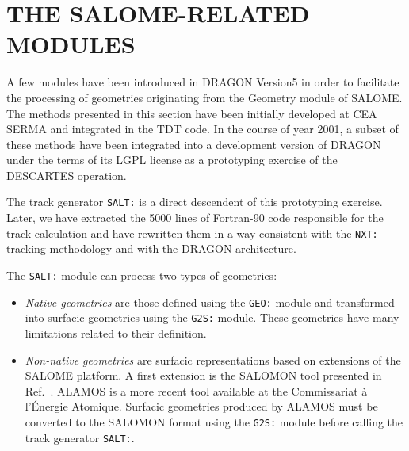 
\section{THE SALOME-RELATED MODULES}\label{sect:SalomeModuleInput}

A few modules have been introduced in DRAGON Version5 in order to facilitate the
processing of geometries originating from the Geometry module of SALOME.\cite{salome}
The methods presented in this section have been initially developed at CEA SERMA and
integrated in the TDT code.\cite{tdt,lyioussi} In the course of year 2001, a subset of
these methods have been integrated into a development version of DRAGON under the terms
of its LGPL license as a prototyping exercise of the DESCARTES operation.\cite{salt}

\vskip 0.08cm

The track generator {\tt SALT:} is a direct descendent of this prototyping exercise.
Later, we have extracted the 5000 lines of Fortran-90 code responsible for the track
calculation and have rewritten them in a way consistent with the {\tt NXT:} tracking
methodology and with the DRAGON architecture.

\vskip 0.08cm

The {\tt SALT:} module can process two types of geometries:
\begin{itemize}
\item {\sl Native geometries} are those defined using the {\tt GEO:} module and transformed into surfacic
geometries using the {\tt G2S:} module. These geometries have many limitations related to their
definition.
\item {\sl Non-native geometries} are surfacic representations based on extensions of the SALOME platform.
A first extension is the SALOMON tool presented in Ref.~. ALAMOS is a more recent tool
available at the Commissariat \`a l'\'Energie Atomique.\cite{alamos} Surfacic geometries produced by
ALAMOS must be converted to the SALOMON format using the {\tt G2S:} module before calling the track
generator {\tt SALT:}.
\end{itemize}

